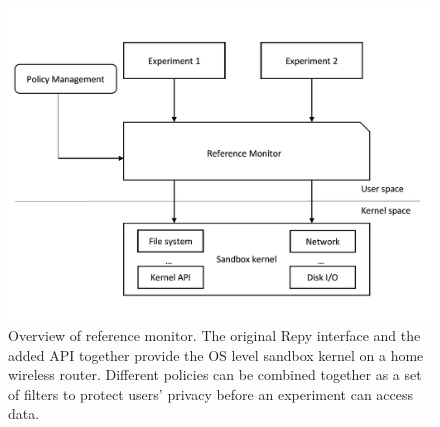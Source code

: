 \begin{figure}%
\centering
\includegraphics[width=0.8\columnwidth]{figure/referencemonitor.png}
\caption{Overview of reference monitor. The original Repy interface and the added API together provide the OS level sandbox kernel on a home wireless router. Different policies can be combined together as a set of filters to protect users' privacy before an experiment can access data.}
\label{fig-reference}
\end{figure}

